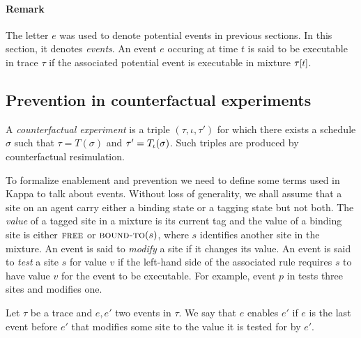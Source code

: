 \ifshort \vspace{-0.4cm} \else \vspace{-0.3cm} \fi

\paragraph{Remark} The letter $e$ was used to denote potential events
in previous sections. In this section, it denotes
\emph{events}. An event $e$ occuring at time $t$ is said to be
executable in trace $\tau$ if the associated potential event is
executable in mixture $\TSTATE{t}{\tau}$.


\subsection{Prevention in counterfactual experiments}
\label{subsec:cex}\label{subsec:inhibition}

A \textit{counterfactual experiment} is a triple
$(\tau, \iota, \tau')$ for which there exists a schedule $\sigma$ such
that $\tau = T(\sigma)$ and $\tau' = {T_\iota}{}(\sigma)$. Such triples
are produced by counterfactual resimulation.

To formalize enablement and prevention we need to define some terms
used in Kappa to talk about events. Without loss of generality, we
shall assume that a site on an agent carry either a binding state or
a tagging state but not both. The
\textit{value} of a tagged site in a mixture is its current tag and
the value of a binding site is either $\textsc{free}$ or
$\textsc{bound-to}(s)$, where $s$ identifies another site in the
mixture.  An event is said to \emph{modify} a site if it changes its
value.  An event is said to \emph{test} a site $s$ for value $v$ if
the left-hand side of the associated rule requires $s$ to have value
$v$ for the event to be executable. For example, event $p$ in
\RefTrace{} tests three sites and modifies one.



\begin{definition}[Enablement]
  Let $\tau$ be a trace and $e, e'$ two events in $\tau$.  We say that
  $e$ enables $e'$ if $e$ is the last event before $e'$ that modifies
  some site to the value it is tested for by $e'$.
\end{definition}

